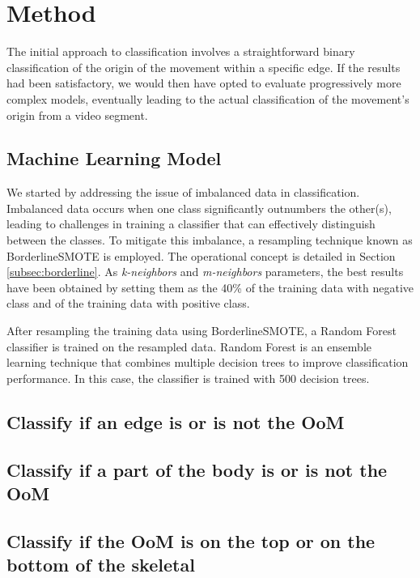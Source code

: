 \chapter{Method}

The initial approach to classification involves a straightforward binary classification of the origin of the movement within a specific edge.
If the results had been satisfactory, we would then have opted to evaluate progressively more complex models, eventually leading to the actual classification of the movement's origin from a video segment.

\section{Machine Learning Model}
We started by addressing the issue of imbalanced data in classification. Imbalanced data occurs when one class significantly outnumbers the other(s), leading to challenges in training a classifier that can effectively distinguish between the classes.
To mitigate this imbalance, a resampling technique known as BorderlineSMOTE is employed. The operational concept is detailed in Section \ref{subsec:borderline}.
As \textit{k-neighbors} and \textit{m-neighbors} parameters, the best results have been obtained by setting them as the 40\% of the training data with negative class and of the training data with positive class.

After resampling the training data using BorderlineSMOTE, a Random Forest classifier is trained on the resampled data. 
Random Forest is an ensemble learning technique that combines multiple decision trees to improve classification performance. 
In this case, the classifier is trained with 500 decision trees.

\section{Classify if an edge is or is not the OoM}

\section{Classify if a part of the body is or is not the OoM}

\section{Classify if the OoM is on the top or on the bottom of the skeletal}



